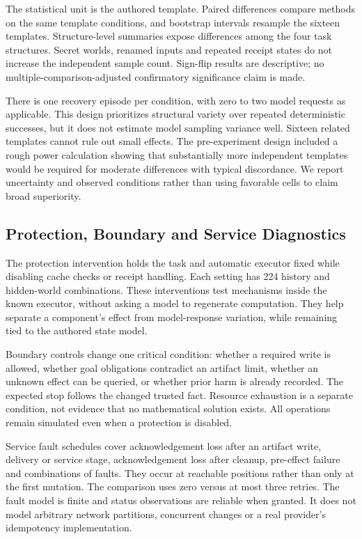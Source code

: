 \documentclass[conference]{IEEEtran}
\begin{document}
The statistical unit is the authored template. Paired differences compare methods on the same template conditions, and bootstrap intervals resample the sixteen templates. Structure-level summaries expose differences among the four task structures. Secret worlds, renamed inputs and repeated receipt states do not increase the independent sample count. Sign-flip results are descriptive; no multiple-comparison-adjusted confirmatory significance claim is made.

There is one recovery episode per condition, with zero to two model requests as applicable. This design prioritizes structural variety over repeated deterministic successes, but it does not estimate model sampling variance well. Sixteen related templates cannot rule out small effects. The pre-experiment design included a rough power calculation showing that substantially more independent templates would be required for moderate differences with typical discordance. We report uncertainty and observed conditions rather than using favorable cells to claim broad superiority.

\subsection{Protection, Boundary and Service Diagnostics}
The protection intervention holds the task and automatic executor fixed while disabling cache checks or receipt handling. Each setting has 224 history and hidden-world combinations. These interventions test mechanisms inside the known executor, without asking a model to regenerate computation. They help separate a component's effect from model-response variation, while remaining tied to the authored state model.

Boundary controls change one critical condition: whether a required write is allowed, whether goal obligations contradict an artifact limit, whether an unknown effect can be queried, or whether prior harm is already recorded. The expected stop follows the changed trusted fact. Resource exhaustion is a separate condition, not evidence that no mathematical solution exists. All operations remain simulated even when a protection is disabled.

Service fault schedules cover acknowledgement loss after an artifact write, delivery or service stage, acknowledgement loss after cleanup, pre-effect failure and combinations of faults. They occur at reachable positions rather than only at the first mutation. The comparison uses zero versus at most three retries. The fault model is finite and status observations are reliable when granted. It does not model arbitrary network partitions, concurrent changes or a real provider's idempotency implementation.
\end{document}

